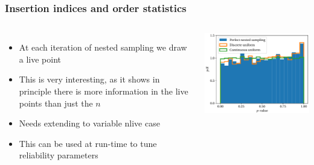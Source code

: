 \documentclass[aspectratio=169,handout]{beamer}
\begin{document}
\begin{frame}
    \frametitle{Insertion indices and order statistics}
    \begin{columns}
    \begin{itemize}
        \item At each iteration of nested sampling we draw a live point 
        \item This is very interesting, as it shows in principle there is more information in the live points than just the $n$
        \item Needs extending to variable nlive case
        \item This can be used at run-time to tune reliability parameters 
    \end{itemize}
        \includegraphics[width=\textwidth]{figures/indices}
    \end{columns}
\end{frame}
\end{document}
